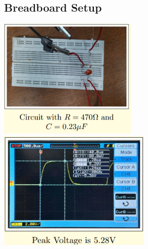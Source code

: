 \documentclass{article}
\begin{document}
\subsection{Breadboard Setup}
\includegraphics[width=0.5\textwidth]{i2.png}
\includegraphics[width=0.55\textwidth]{i3.png}
\end{document}

